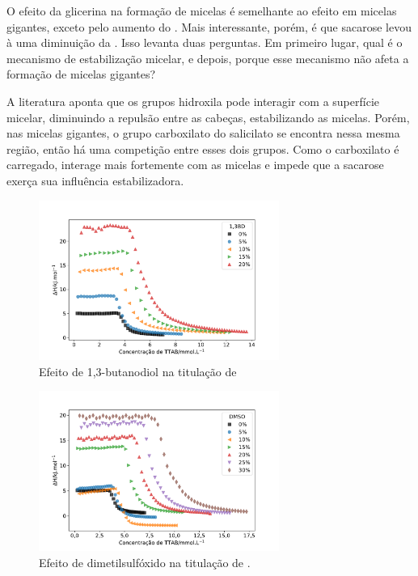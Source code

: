 			O efeito da glicerina na formação de micelas é semelhante ao efeito em micelas gigantes, exceto pelo aumento do \DHmic{}. Mais interessante, porém, é que sacarose levou à uma diminuição da \cmc{}. Isso levanta duas perguntas. Em primeiro lugar, qual é o mecanismo de estabilização micelar, e depois, porque esse mecanismo não afeta a formação de micelas gigantes?
			
			A literatura aponta que os grupos hidroxila pode interagir com a superfície micelar, diminuindo a repulsão entre as cabeças, estabilizando as micelas. Porém, nas micelas gigantes, o grupo carboxilato do salicilato se encontra nessa mesma região, então há uma competição entre esses dois grupos. Como o carboxilato é carregado, interage mais fortemente com as micelas e impede que a sacarose exerça sua influência estabilizadora. 
			
			\begin{figure}[h]
				\centering
				\includegraphics[width=0.7\textwidth]{imagens/itc/ITC_13BD}
				\caption{Efeito de 1,3-butanodiol na titulação de \TTAB}
				\label{fig:itc_13bd}
			\end{figure} 
		
			\begin{figure}[h]
				\centering
				\includegraphics[width=0.7\textwidth]{imagens/itc/ITC_dmso}
				\caption{Efeito de dimetilsulfóxido na titulação de \TTAB.}
				\label{fig:itc_dmso}
			\end{figure}
			
